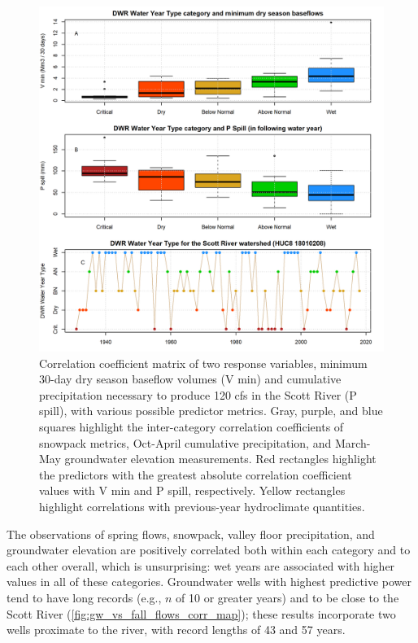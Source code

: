 \documentclass[hess, manuscript]{copernicus}
\begin{document}
\begin{figure}
\includegraphics[width=1\linewidth]{f07} \caption{\label{fig:corr_matrix} Correlation coefficient matrix of two response variables, minimum 30-day dry season baseflow volumes (V min) and cumulative precipitation necessary to produce 120 cfs in the Scott River (P spill), with various possible predictor metrics. Gray, purple, and blue squares highlight the inter-category correlation coefficients of snowpack metrics, Oct-April cumulative precipitation, and March-May groundwater elevation measurements. Red rectangles highlight the predictors with the greatest absolute correlation coefficient values with V min and P spill, respectively. Yellow rectangles highlight correlations with previous-year hydroclimate quantities.}\label{fig:corr_matrix}
\end{figure}

The observations of spring flows, snowpack, valley floor precipitation,
and groundwater elevation are positively correlated both within each
category and to each other overall, which is unsurprising: wet years are
associated with higher values in all of these categories. Groundwater
wells with highest predictive power tend to have long records (e.g.,
\(n\) of 10 or greater years) and to be close to the Scott River
(\autoref{fig:gw_vs_fall_flows_corr_map}); these results incorporate two
wells proximate to the river, with record lengths of 43 and 57 years.
\end{document}
